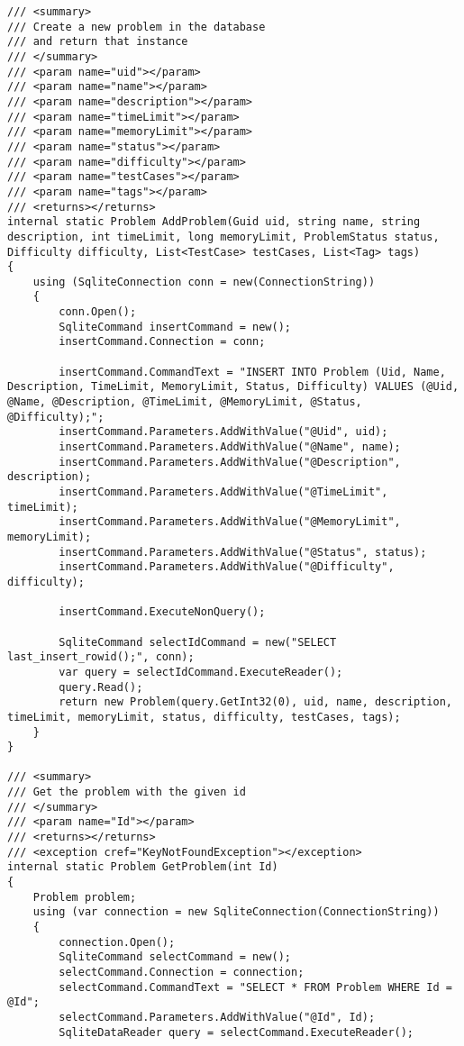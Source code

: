 \documentclass[report.tex]{subfiles}
\begin{document}
\begin{verbatim}
/// <summary>
/// Create a new problem in the database
/// and return that instance
/// </summary>
/// <param name="uid"></param>
/// <param name="name"></param>
/// <param name="description"></param>
/// <param name="timeLimit"></param>
/// <param name="memoryLimit"></param>
/// <param name="status"></param>
/// <param name="difficulty"></param>
/// <param name="testCases"></param>
/// <param name="tags"></param>
/// <returns></returns>
internal static Problem AddProblem(Guid uid, string name, string description, int timeLimit, long memoryLimit, ProblemStatus status, Difficulty difficulty, List<TestCase> testCases, List<Tag> tags)
{
    using (SqliteConnection conn = new(ConnectionString))
    {
        conn.Open();
        SqliteCommand insertCommand = new();
        insertCommand.Connection = conn;

        insertCommand.CommandText = "INSERT INTO Problem (Uid, Name, Description, TimeLimit, MemoryLimit, Status, Difficulty) VALUES (@Uid, @Name, @Description, @TimeLimit, @MemoryLimit, @Status, @Difficulty);";
        insertCommand.Parameters.AddWithValue("@Uid", uid);
        insertCommand.Parameters.AddWithValue("@Name", name);
        insertCommand.Parameters.AddWithValue("@Description", description);
        insertCommand.Parameters.AddWithValue("@TimeLimit", timeLimit);
        insertCommand.Parameters.AddWithValue("@MemoryLimit", memoryLimit);
        insertCommand.Parameters.AddWithValue("@Status", status);
        insertCommand.Parameters.AddWithValue("@Difficulty", difficulty);

        insertCommand.ExecuteNonQuery();

        SqliteCommand selectIdCommand = new("SELECT last_insert_rowid();", conn);
        var query = selectIdCommand.ExecuteReader();
        query.Read();
        return new Problem(query.GetInt32(0), uid, name, description, timeLimit, memoryLimit, status, difficulty, testCases, tags);
    }
}

/// <summary>
/// Get the problem with the given id
/// </summary>
/// <param name="Id"></param>
/// <returns></returns>
/// <exception cref="KeyNotFoundException"></exception>
internal static Problem GetProblem(int Id)
{
    Problem problem;
    using (var connection = new SqliteConnection(ConnectionString))
    {
        connection.Open();
        SqliteCommand selectCommand = new();
        selectCommand.Connection = connection;
        selectCommand.CommandText = "SELECT * FROM Problem WHERE Id = @Id";
        selectCommand.Parameters.AddWithValue("@Id", Id);
        SqliteDataReader query = selectCommand.ExecuteReader();


\end{verbatim}
\end{document}
